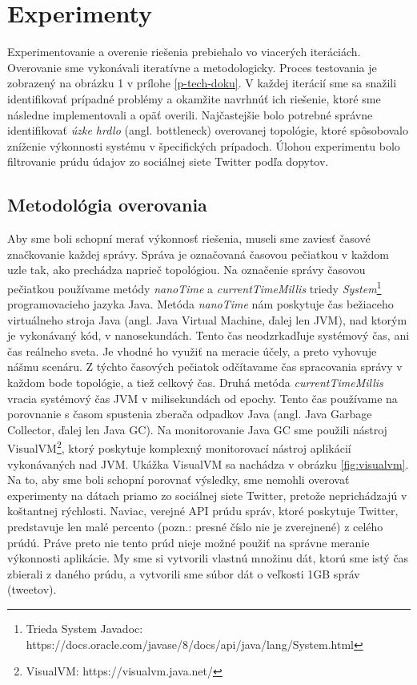\newpage
\chapter{Experimenty}
\label{experimenty}
Experimentovanie a overenie riešenia prebiehalo vo viacerých iteráciách. Overovanie sme vykonávali iteratívne a metodologicky. Proces testovania je zobrazený na obrázku 1 v prílohe \ref{p-tech-doku}. V každej iterácií sme sa snažili identifikovať prípadné problémy a okamžite navrhnúť ich riešenie, ktoré sme následne implementovali a opäť overili. Najčastejšie bolo potrebné správne identifikovať \textit{úzke hrdlo} (angl. bottleneck) overovanej topológie, ktoré spôsobovalo zníženie výkonnosti systému v špecifických prípadoch. Úlohou experimentu bolo filtrovanie prúdu údajov zo sociálnej siete Twitter podľa dopytov. 


\section{Metodológia overovania}
Aby sme boli schopní merať výkonnosť riešenia, museli sme zaviesť časové značkovanie každej správy. Správa je označovaná časovou pečiatkou v každom uzle tak, ako prechádza naprieč topológiou. Na označenie správy časovou pečiatkou používame metódy \textit{nanoTime} a \textit{currentTimeMillis} triedy \textit{System}\footnote{Trieda System Javadoc: https://docs.oracle.com/javase/8/docs/api/java/lang/System.html} programovacieho jazyka Java. Metóda \textit{nanoTime} nám poskytuje čas bežiaceho virtuálneho stroja Java (angl. Java Virtual Machine, ďalej len JVM), nad ktorým je vykonávaný kód, v nanosekundách. Tento čas neodzrkadľuje systémový čas, ani čas reálneho sveta. Je vhodné ho využiť na meracie účely, a preto vyhovuje nášmu scenáru. Z týchto časových pečiatok odčítavame čas spracovania správy v každom bode topológie, a tiež celkový čas. Druhá metóda \textit{currentTimeMillis} vracia systémový čas JVM v milisekundách od epochy. Tento čas používame na porovnanie s časom spustenia zberača odpadkov Java (angl. Java Garbage Collector, ďalej len Java GC). Na monitorovanie Java GC sme použili nástroj VisualVM\footnote{VisualVM: https://visualvm.java.net/}, ktorý poskytuje komplexný monitorovací nástroj aplikácií vykonávaných nad JVM. Ukážka VisualVM sa nachádza v obrázku \ref{fig:visualvm}.
\\[5pt]
Na to, aby sme boli schopní porovnať výsledky, sme nemohli overovať experimenty na dátach priamo zo sociálnej siete Twitter, pretože neprichádzajú v koštantnej rýchlosti. Naviac, verejné API prúdu správ, ktoré poskytuje Twitter, predstavuje len malé percento (pozn.: presné číslo nie je zverejnené) z celého prúdú. Práve preto nie tento prúd nieje možné použiť na správne meranie výkonnosti aplikácie. My sme si vytvorili vlastnú množinu dát, ktorú sme istý čas zbierali z daného prúdu, a vytvorili sme súbor dát o veľkosti 1GB správ (tweetov). 


